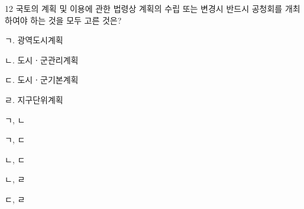 \begin{question}{12}
국토의 계획 및 이용에 관한 법령상 계획의 수립 또는 변경시 반드시 공청회를 개최하여야 하는 것을 모두 고른 것은?
\begin{framedtext}
ㄱ. 광역도시계획 \par
ㄴ. 도시ㆍ군관리계획 \par
ㄷ. 도시ㆍ군기본계획 \par
ㄹ. 지구단위계획 \par
\end{framedtext}
\begin{choices}
  \item ㄱ, ㄴ
  \item ㄱ, ㄷ
  \item ㄴ, ㄷ
  \item ㄴ, ㄹ
  \item ㄷ, ㄹ
\end{choices}
\end{question}
